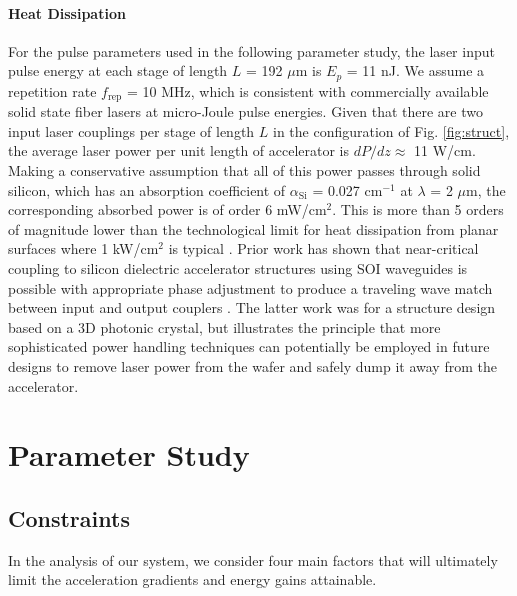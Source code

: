 \paragraph{Heat Dissipation}

For the pulse parameters used in the following parameter study, the laser input pulse energy at each stage of length $L$ = 192 $\mu$m is $E_p$ = 11 nJ.
We assume a repetition rate $f_\text{rep}$ = 10 MHz, which is consistent with commercially available solid state fiber lasers at micro-Joule pulse energies.
Given that there are two input laser couplings per stage of length $L$ in the configuration of Fig.
\ref{fig:struct}, the average laser power per unit length of accelerator is $dP/dz \approx$ 11 W/cm.
Making a conservative assumption that all of this power passes through solid silicon, which has an absorption coefficient of $\alpha_\text{Si}$ = 0.027 $\text{cm}^{-1}$ at $\lambda$ = 2 $\mu$m, the corresponding absorbed power is of order 6 mW/$\text{cm}^2$.
This is more than 5 orders of magnitude lower than the technological limit for heat dissipation from planar surfaces where 1 kW/$\text{cm}^2$ is typical \cite{eggleston:1984,rutherford:2000}.
Prior work has shown that near-critical coupling to silicon dielectric accelerator structures using SOI waveguides is possible with appropriate phase adjustment to produce a traveling wave match between input and output couplers \cite{wu:2014}.
The latter work was for a structure design based on a 3D photonic crystal, but illustrates the principle that more sophisticated power handling techniques can potentially be employed in future designs to remove laser power from the wafer and safely dump it away from the accelerator.

\section{Parameter Study}

\subsection{\label{sec:constraints}Constraints}

In the analysis of our system, we consider four main factors that will ultimately limit the acceleration gradients and energy gains attainable.

